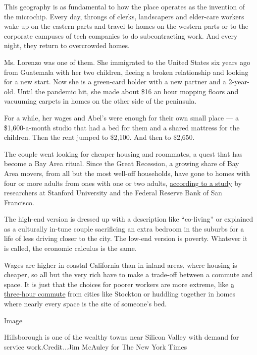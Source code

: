 This geography is as fundamental to how the place operates as the
invention of the microchip. Every day, throngs of clerks, landscapers
and elder-care workers wake up on the eastern parts and travel to homes
on the western parts or to the corporate campuses of tech companies to
do subcontracting work. And every night, they return to overcrowded
homes.

Ms. Lorenzo was one of them. She immigrated to the United States six
years ago from Guatemala with her two children, fleeing a broken
relationship and looking for a new start. Now she is a green-card holder
with a new partner and a 2-year-old. Until the pandemic hit, she made
about \$16 an hour mopping floors and vacuuming carpets in homes on the
other side of the peninsula.

For a while, her wages and Abel's were enough for their own small place
--- a \$1,600-a-month studio that had a bed for them and a shared
mattress for the children. Then the rent jumped to \$2,100. And then to
\$2,650.

The couple went looking for cheaper housing and roommates, a quest that
has become a Bay Area ritual. Since the Great Recession, a growing share
of Bay Area movers, from all but the most well-off households, have gone
to homes with four or more adults from ones with one or two adults,
\href{https://www.frbsf.org/community-development/blog/overcrowding-in-the-bay-area-where-the-housing-crisis-meets-covid-19/}{according
to a study} by researchers at Stanford University and the Federal
Reserve Bank of San Francisco.

The high-end version is dressed up with a description like ``co-living''
or explained as a culturally in-tune couple sacrificing an extra bedroom
in the suburbs for a life of less driving closer to the city. The
low-end version is poverty. Whatever it is called, the economic calculus
is the same.

Wages are higher in coastal California than in inland areas, where
housing is cheaper, so all but the very rich have to make a trade-off
between a commute and space. It is just that the choices for poorer
workers are more extreme, like
\href{https://www.nytimes3xbfgragh.onion/2017/08/17/business/economy/san-francisco-commute.html}{a
three-hour commute} from cities like Stockton or huddling together in
homes where nearly every space is the site of someone's bed.

Image

Hillsborough is one of the wealthy towns near Silicon Valley with demand
for service work.Credit...Jim McAuley for The New York Times

